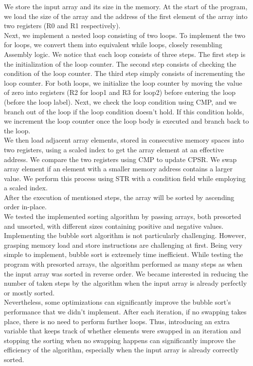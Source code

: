 \documentclass[10pt]{article}
\begin{document}
We store the input array and its size in the memory. At the start of the program, we load the size of the array and the address of the first element of the array into two registers (R0 and R1 respectively).\\
Next, we implement a nested loop consisting of two loops. To implement the two for loops, we convert them into equivalent while loops, closely resembling Assembly logic. We notice that each loop consists of three steps. The first step is the initialization of the loop counter. The second step consists of checking the condition of the loop counter. The third step simply consists of incrementing the loop counter. For both loops, we initialize the loop counter by moving the value of zero into registers (R2 for loop1 and R3 for loop2) before entering the loop (before the loop label).  Next, we check the loop condition using CMP, and we branch out of the loop if the loop condition doesn't hold. If this condition holds, we increment the loop counter once the loop body is executed and branch back to the loop.\\
We then load adjacent array elements, stored in consecutive memory spaces into two registers, using a scaled index to get the array element at an effective address. We compare the two registers using CMP to update CPSR. We swap array element if an element with a smaller memory address contains a larger value.  We perform this process using STR with a  condition field while employing a scaled index.\\
After the execution of mentioned steps, the array will be sorted by ascending order in-place.\\

We tested the implemented sorting algorithm by passing arrays, both presorted and unsorted, with different sizes containing positive and negative values.
Implementing the bubble sort algorithm is not particularly challenging. However, grasping memory load and store instructions are challenging at first. Being very simple to implement, bubble sort is extremely time inefficient. While testing the program with presorted arrays, the algorithm performed as many steps as when the input array was sorted in reverse order. We became interested in reducing the number of taken steps by the algorithm when the input array is already perfectly or mostly sorted. \\
Nevertheless, some optimizations can significantly improve the bubble sort's performance that we didn't implement. After each iteration, if no swapping takes place, there is no need to perform further loops. Thus, introducing an extra variable that keeps track of whether elements were swapped in an iteration and stopping the sorting when no swapping happens can significantly improve the efficiency of the algorithm, especially when the input array is already correctly sorted.
\end{document}
